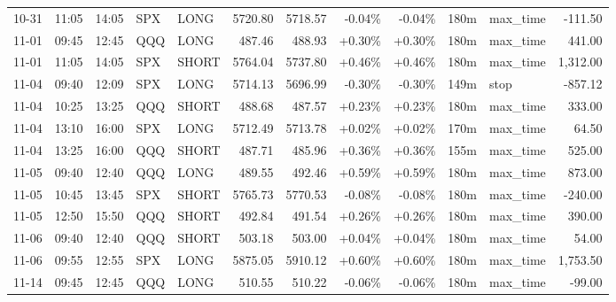 \documentclass[11pt,a4paper,twoside]{article}
\begin{document}
\begin{center}
\begin{longtable}{>{\color{txtmain}}l l l l l r r r r r >{\color{txtmain}}l r}
10-31 & 11:05 & 14:05 & SPX & LONG & 5720.80 & 5718.57 & \textcolor{lossred}{-0.04\%} & \textcolor{lossred}{-0.04\%} & 180m & max\_time & \textcolor{lossred}{-111.50} \\
11-01 & 09:45 & 12:45 & QQQ & LONG & 487.46 & 488.93 & \textcolor{wingreen}{+0.30\%} & \textcolor{wingreen}{+0.30\%} & 180m & max\_time & \textcolor{wingreen}{441.00} \\
11-01 & 11:05 & 14:05 & SPX & SHORT & 5764.04 & 5737.80 & \textcolor{wingreen}{+0.46\%} & \textcolor{wingreen}{+0.46\%} & 180m & max\_time & \textcolor{wingreen}{1,312.00} \\
11-04 & 09:40 & 12:09 & SPX & LONG & 5714.13 & 5696.99 & \textcolor{lossred}{-0.30\%} & \textcolor{lossred}{-0.30\%} & 149m & stop & \textcolor{lossred}{-857.12} \\
11-04 & 10:25 & 13:25 & QQQ & SHORT & 488.68 & 487.57 & \textcolor{wingreen}{+0.23\%} & \textcolor{wingreen}{+0.23\%} & 180m & max\_time & \textcolor{wingreen}{333.00} \\
11-04 & 13:10 & 16:00 & SPX & LONG & 5712.49 & 5713.78 & \textcolor{wingreen}{+0.02\%} & \textcolor{wingreen}{+0.02\%} & 170m & max\_time & \textcolor{wingreen}{64.50} \\
11-04 & 13:25 & 16:00 & QQQ & SHORT & 487.71 & 485.96 & \textcolor{wingreen}{+0.36\%} & \textcolor{wingreen}{+0.36\%} & 155m & max\_time & \textcolor{wingreen}{525.00} \\
11-05 & 09:40 & 12:40 & QQQ & LONG & 489.55 & 492.46 & \textcolor{wingreen}{+0.59\%} & \textcolor{wingreen}{+0.59\%} & 180m & max\_time & \textcolor{wingreen}{873.00} \\
11-05 & 10:45 & 13:45 & SPX & SHORT & 5765.73 & 5770.53 & \textcolor{lossred}{-0.08\%} & \textcolor{lossred}{-0.08\%} & 180m & max\_time & \textcolor{lossred}{-240.00} \\
11-05 & 12:50 & 15:50 & QQQ & SHORT & 492.84 & 491.54 & \textcolor{wingreen}{+0.26\%} & \textcolor{wingreen}{+0.26\%} & 180m & max\_time & \textcolor{wingreen}{390.00} \\
11-06 & 09:40 & 12:40 & QQQ & SHORT & 503.18 & 503.00 & \textcolor{wingreen}{+0.04\%} & \textcolor{wingreen}{+0.04\%} & 180m & max\_time & \textcolor{wingreen}{54.00} \\
11-06 & 09:55 & 12:55 & SPX & LONG & 5875.05 & 5910.12 & \textcolor{wingreen}{+0.60\%} & \textcolor{wingreen}{+0.60\%} & 180m & max\_time & \textcolor{wingreen}{1,753.50} \\
11-14 & 09:45 & 12:45 & QQQ & LONG & 510.55 & 510.22 & \textcolor{lossred}{-0.06\%} & \textcolor{lossred}{-0.06\%} & 180m & max\_time & \textcolor{lossred}{-99.00} \\

\end{longtable}
\end{center}
\end{document}
